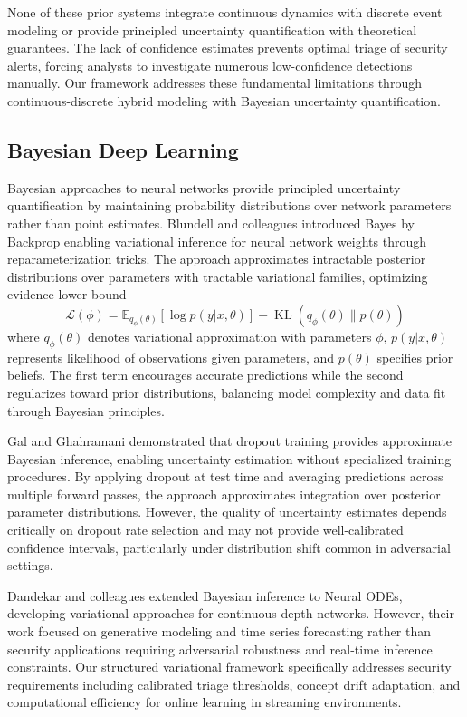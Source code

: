\documentclass[10pt,journal,compsoc]{IEEEtran}
\DeclareMathOperator{\KL}{KL}
\begin{document}
None of these prior systems integrate continuous dynamics with discrete event modeling or provide principled uncertainty quantification with theoretical guarantees. The lack of confidence estimates prevents optimal triage of security alerts, forcing analysts to investigate numerous low-confidence detections manually. Our framework addresses these fundamental limitations through continuous-discrete hybrid modeling with Bayesian uncertainty quantification.

\subsection{Bayesian Deep Learning}

Bayesian approaches to neural networks provide principled uncertainty quantification by maintaining probability distributions over network parameters rather than point estimates. Blundell and colleagues introduced Bayes by Backprop enabling variational inference for neural network weights through reparameterization tricks. The approach approximates intractable posterior distributions over parameters with tractable variational families, optimizing evidence lower bound
\begin{equation}
\mathcal{L}(\phi) = \mathbb{E}_{q_\phi(\theta)}[\log p(y|x, \theta)] - \KL(q_\phi(\theta) \| p(\theta))
\label{eq:elbo}
\end{equation}
where $q_\phi(\theta)$ denotes variational approximation with parameters $\phi$, $p(y|x, \theta)$ represents likelihood of observations given parameters, and $p(\theta)$ specifies prior beliefs. The first term encourages accurate predictions while the second regularizes toward prior distributions, balancing model complexity and data fit through Bayesian principles.

Gal and Ghahramani demonstrated that dropout training provides approximate Bayesian inference, enabling uncertainty estimation without specialized training procedures. By applying dropout at test time and averaging predictions across multiple forward passes, the approach approximates integration over posterior parameter distributions. However, the quality of uncertainty estimates depends critically on dropout rate selection and may not provide well-calibrated confidence intervals, particularly under distribution shift common in adversarial settings.

Dandekar and colleagues extended Bayesian inference to Neural ODEs, developing variational approaches for continuous-depth networks. However, their work focused on generative modeling and time series forecasting rather than security applications requiring adversarial robustness and real-time inference constraints. Our structured variational framework specifically addresses security requirements including calibrated triage thresholds, concept drift adaptation, and computational efficiency for online learning in streaming environments.
\end{document}

